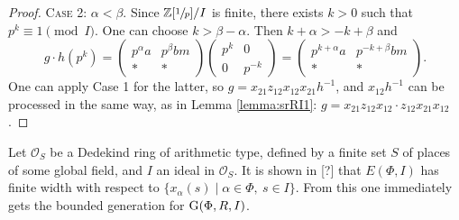 \begin{proof}
\textsc{Case 2:} $\alpha<\beta$. Since $\mathbb{Z}[\sfrac{1}{p}]/I$ is finite, there exists $k>0$ such that $p^k\equiv 1\pmod I$. One can choose $k>\beta-\alpha$. Then $k+\alpha>-k+\beta$ and
\[ g\cdot h\left(p^k\right) =
\begin{pmatrix} p^\alpha a & p^\beta bm \\ * & * \end{pmatrix}
\begin{pmatrix} p^k & 0 \\ 0 & p^{-k} \end{pmatrix}=
\begin{pmatrix} p^{k+\alpha} a & p^{-k+\beta} bm \\ * & * \end{pmatrix}.
\]
One can apply Case 1 for the latter, so
$g=x_{21}z_{12}x_{12}x_{21}h^{-1}$,
and $x_{12}h^{-1}$ can be processed in the same way, as in Lemma \ref{lemma:srRI1}:
$g=x_{21}z_{12}x_{12}\cdot z_{12}x_{21}x_{12}$.
\end{proof}
Let $\mathcal{O}_S$ be a Dedekind ring of arithmetic type, defined by a finite set $S$ of places of some global field, and $I$ an ideal in $\mathcal{O}_S$. It is shown in [?] that $E(\Phi,I)$ has finite width with respect to $\{x_\alpha(s)\mid\alpha\in\Phi,\ s\in I\}$. From this one immediately gets the bounded generation for $\operatorname{G}(\Phi,R,I)$.

